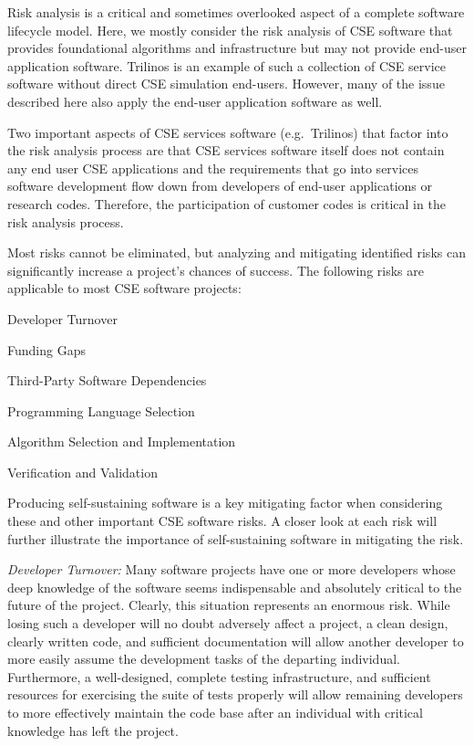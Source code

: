 \documentclass[11pt]{SANDreport}
\begin{document}
Risk analysis is a critical and sometimes overlooked aspect of a
complete software lifecycle model.  Here, we mostly consider the risk
analysis of CSE software that provides foundational algorithms and
infrastructure but may not provide end-user application software.
Trilinos is an example of such a collection of CSE service software
without direct CSE simulation end-users.  However, many of the issue
described here also apply the end-user application software as well.

Two important aspects of CSE services software (e.g.\ Trilinos) that
factor into the risk analysis process are that CSE services software
itself does not contain any end user CSE applications and the
requirements that go into services software development flow down from
developers of end-user applications or research codes.  Therefore, the
participation of customer codes is critical in the risk analysis
process.

Most risks cannot be eliminated, but analyzing and mitigating
identified risks can significantly increase a project's chances of
success.  The following risks are applicable to most CSE software
projects:

\begin{compactitem}

{}\item Developer Turnover

{}\item Funding Gaps

{}\item Third-Party Software Dependencies

{}\item Programming Language Selection

{}\item Algorithm Selection and Implementation

{}\item Verification and Validation

\end{compactitem}

Producing self-sustaining software is a key mitigating factor when
considering these and other important CSE software risks.  A closer
look at each risk will further illustrate the importance of
self-sustaining software in mitigating the risk.

{}\textit{Developer Turnover:} Many software projects have one or more
developers whose deep knowledge of the software seems indispensable
and absolutely critical to the future of the project.  Clearly, this
situation represents an enormous risk.  While losing such a developer
will no doubt adversely affect a project, a clean design, clearly
written code, and sufficient documentation will allow another
developer to more easily assume the development tasks of the departing
individual.  Furthermore, a well-designed, complete testing
infrastructure, and sufficient resources for exercising the suite of
tests properly will allow remaining developers to more effectively
maintain the code base after an individual with critical knowledge has
left the project.
\end{document}
